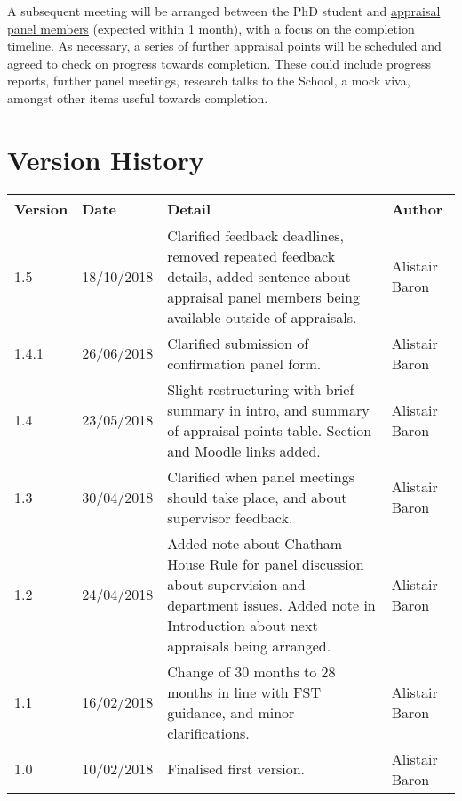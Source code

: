 \documentclass[12pt,a4paper]{article}
\begin{document}
A subsequent meeting will be arranged between the PhD student and \hyperref[sec:panel]{appraisal panel members} (expected within 1 month), with a focus on the completion timeline. As necessary, a series of further appraisal points will be scheduled and agreed to check on progress towards completion. These could include progress reports, further panel meetings, research talks to the School, a mock viva, amongst other items useful towards completion.

\newpage
\section{Version History}
\begin{tabularx}{\textwidth}{llXl}
	\textbf{Version} & \textbf{Date} & \textbf{Detail} & \textbf{Author} \\ 
	\hline
	1.5 & 18/10/2018 & Clarified feedback deadlines, removed repeated feedback details, added sentence about appraisal panel members being available outside of appraisals. & Alistair Baron \\
	1.4.1 & 26/06/2018 & Clarified submission of confirmation panel form. & Alistair Baron \\
	1.4 & 23/05/2018 & Slight restructuring with brief summary in intro, and summary of appraisal points table. Section and Moodle links added. & Alistair Baron \\
	1.3 & 30/04/2018 & Clarified when panel meetings should take place, and about supervisor feedback. & Alistair Baron \\
	1.2	& 24/04/2018 & Added note about Chatham House Rule for panel discussion about supervision and department issues. Added note in Introduction about next appraisals being arranged. & Alistair Baron \\
	1.1	& 16/02/2018 & Change of 30 months to 28 months in line with FST guidance, and minor clarifications. & Alistair Baron \\
	1.0 & 10/02/2018 & Finalised first version. & Alistair Baron \\ 
\end{tabularx} 
\end{document}
